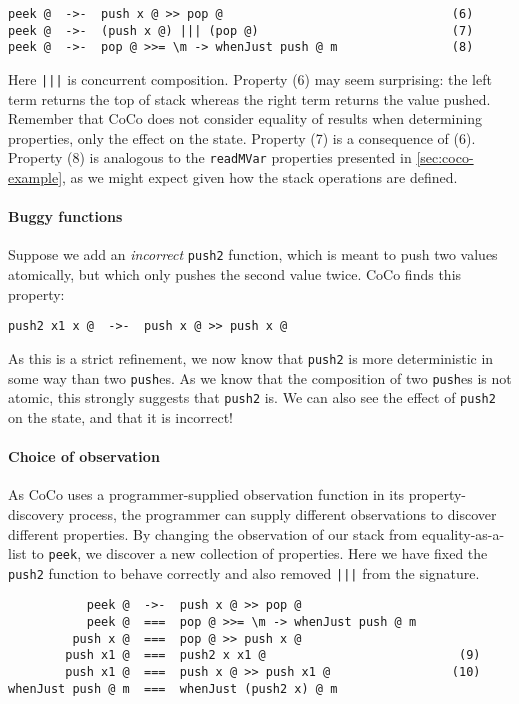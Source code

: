 \begin{verbatim}
peek @  ->-  push x @ >> pop @                                (6)
peek @  ->-  (push x @) ||| (pop @)                           (7)
peek @  ->-  pop @ >>= \m -> whenJust push @ m                (8)
\end{verbatim}

\noindent
Here \verb#|||# is concurrent composition.  Property (6) may seem
surprising: the left term returns the top of stack whereas the right
term returns the value pushed.  Remember that CoCo does not consider
equality of results when determining properties, only the effect on
the state.  Property (7) is a consequence of (6).  Property (8) is
analogous to the \verb|readMVar| properties presented in
\cref{sec:coco-example}, as we might expect given how the stack
operations are defined.

\paragraph{Buggy functions}
Suppose we add an \emph{incorrect} \verb|push2| function, which is
meant to push two values atomically, but which only pushes the second
value twice.  CoCo finds this property:

\begin{verbatim}
push2 x1 x @  ->-  push x @ >> push x @
\end{verbatim}

\noindent
As this is a strict refinement, we now know that \verb|push2| is more
deterministic in some way than two \verb|push|es.  As we know that the
composition of two \verb|push|es is not atomic, this strongly suggests
that \verb|push2| is.  We can also see the effect of \verb|push2| on
the state, and that it is incorrect!

\paragraph{Choice of observation}
As CoCo uses a programmer-supplied observation function in its
property-discovery process, the programmer can supply different
observations to discover different properties.  By changing the
observation of our stack from equality-as-a-list to \verb|peek|, we
discover a new collection of properties.  Here we have fixed the
\verb|push2| function to behave correctly and also removed \verb#|||#
from the signature.

\begin{verbatim}
           peek @  ->-  push x @ >> pop @
           peek @  ===  pop @ >>= \m -> whenJust push @ m
         push x @  ===  pop @ >> push x @
        push x1 @  ===  push2 x x1 @                           (9)
        push x1 @  ===  push x @ >> push x1 @                 (10)
whenJust push @ m  ===  whenJust (push2 x) @ m
\end{verbatim}

